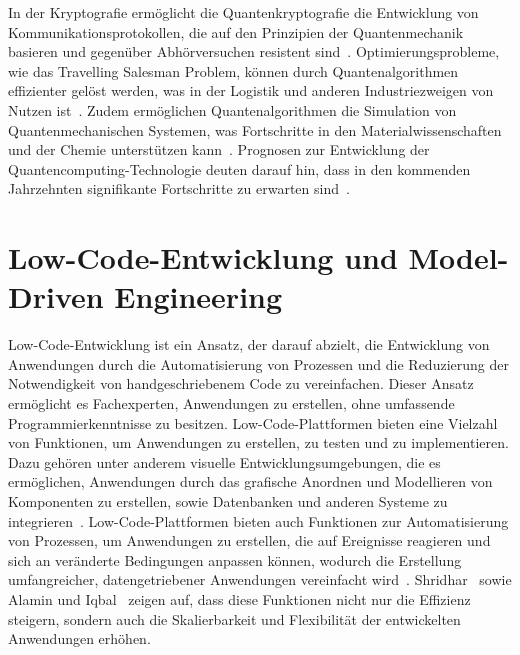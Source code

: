 In der Kryptografie ermöglicht die Quantenkryptografie die Entwicklung von Kommunikationsprotokollen, die auf den Prinzipien der 
Quantenmechanik basieren und gegenüber Abhörversuchen resistent sind~\cite{bennett2014quantum}. 
Optimierungsprobleme, wie das Travelling Salesman Problem, können durch Quantenalgorithmen effizienter 
gelöst werden, was in der Logistik und anderen Industriezweigen von Nutzen ist~\cite{farhi2000quantum}. 
Zudem ermöglichen Quantenalgorithmen die Simulation von Quantenmechanischen Systemen, was Fortschritte 
in den Materialwissenschaften und der Chemie unterstützen kann~\cite{aspuru2005simulated}. Prognosen zur Entwicklung der Quantencomputing-Technologie 
deuten darauf hin, dass in den kommenden Jahrzehnten signifikante Fortschritte zu erwarten sind~\cite{ladd2010quantum}.

\section{Low-Code-Entwicklung und Model-Driven Engineering}
Low-Code-Entwicklung ist ein Ansatz, der darauf abzielt, die Entwicklung von Anwendungen 
durch die Automatisierung von Prozessen und die Reduzierung der Notwendigkeit von 
handgeschriebenem Code zu vereinfachen. Dieser Ansatz ermöglicht es Fachexperten, Anwendungen 
zu erstellen, ohne umfassende Programmierkenntnisse zu besitzen. Low-Code-Plattformen 
bieten eine Vielzahl von Funktionen, um Anwendungen zu erstellen, zu 
testen und zu implementieren. Dazu gehören unter anderem visuelle Entwicklungsumgebungen, 
die es ermöglichen, Anwendungen durch das grafische Anordnen und Modellieren von Komponenten zu erstellen, 
sowie Datenbanken und anderen Systeme zu integrieren~\cite{Bock_2021}. 
Low-Code-Plattformen bieten auch Funktionen zur Automatisierung von Prozessen, um Anwendungen zu 
erstellen, die auf Ereignisse reagieren und sich an veränderte Bedingungen anpassen können, 
wodurch die Erstellung umfangreicher, datengetriebener Anwendungen vereinfacht wird~\cite{Bock_2021}. 
Shridhar~\cite{Shridhar_2021} sowie Alamin und Iqbal~\cite{Alamin_2021} zeigen auf, dass diese 
Funktionen nicht nur die Effizienz steigern, sondern auch die Skalierbarkeit und Flexibilität 
der entwickelten Anwendungen erhöhen.

